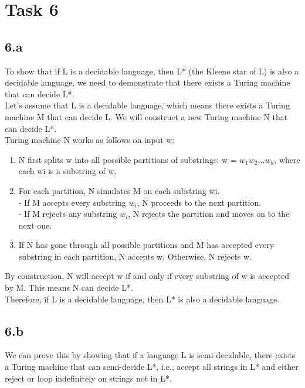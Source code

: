 \chapter{Task 6}
\section{6.a}
To show that if L is a decidable language, then L* (the Kleene star of L) is also a decidable language, we need to demonstrate that there exists a Turing machine that can decide L*.\\

Let's assume that L is a decidable language, which means there exists a Turing machine M that can decide L. We will construct a new Turing machine N that can decide L*.\\

Turing machine N works as follows on input w:
\begin{enumerate}
	\item N first splits w into all possible partitions of substrings: w = $w_1w_2 \dots w_k$, where each wi is a substring of w.
	\item For each partition, N simulates M on each substring wi.\\
   - If M accepts every substring $w_i$, N proceeds to the next partition.\\
   - If M rejects any substring $w_i$, N rejects the partition and moves on to the next one.\\
   \item If N has gone through all possible partitions and M has accepted every substring in each partition, N accepts w. Otherwise, N rejects w.
\end{enumerate}

By construction, N will accept w if and only if every substring of w is accepted by M. This means N can decide L*.\\

Therefore, if L is a decidable language, then L* is also a decidable language.\\
\section{6.b}
We can prove this by showing that if a language L is semi-decidable, there exists a Turing machine that can semi-decide L*, i.e., accept all strings in L* and either reject or loop indefinitely on strings not in L*.\\

